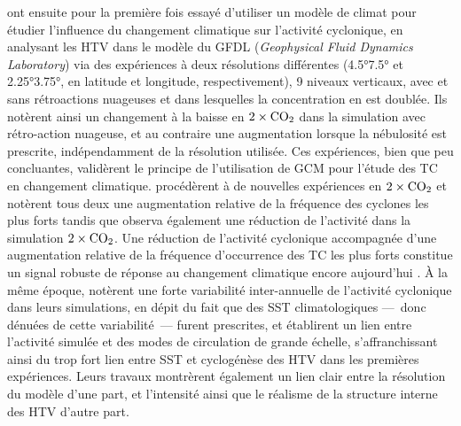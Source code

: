 \documentclass[../main.tex]{subfiles}
\begin{document}
\textcite{broccoli_can_1990} ont ensuite pour la première fois essayé d'utiliser un modèle de climat pour étudier l'influence du changement climatique sur
l'activité cyclonique, en analysant les HTV dans le modèle du GFDL (\textit{Geophysical Fluid Dynamics Laboratory}) via des expériences à deux résolutions
différentes (\ang{4.5}\times\ang{7.5} et \ang{2.25}\times\ang{3.75}, en latitude et longitude, respectivement), \num{9} niveaux verticaux, avec et sans
rétroactions nuageuses et dans lesquelles la concentration en  est doublée. Ils notèrent ainsi un changement à la baisse en \ensuremath{2\times\ce{CO2}}
dans la simulation avec rétro-action nuageuse, et au contraire une augmentation lorsque la nébulosité est prescrite, indépendamment de la résolution utilisée.
Ces expériences, bien que peu concluantes, validèrent le principe de l'utilisation de GCM pour l'étude des TC en changement climatique.
\textcite{haarsma_tropical_1993,bengtsson_will_1996} procédèrent à de nouvelles expériences en \ensuremath{2\times\ce{CO2}} et notèrent tous deux une augmentation
relative de la fréquence des cyclones les plus forts tandis que \textcite{bengtsson_will_1996} observa également une réduction de l'activité dans la simulation
\ensuremath{2\times\ce{CO2}}. Une réduction de l'activité cyclonique accompagnée d'une augmentation relative de la fréquence d'occurrence des TC les plus forts
constitue un signal robuste de réponse au changement climatique encore aujourd'hui \parencite[][voir
\cref{sec:projections_futures}]{walsh_tropical_2016,camargo_tropical_2016,knutson_tropical_2010,knutson_tropical_2010,seneviratne_weather_2021}. À la même
époque, \textcite{bengtsson_hurricanetype_1995} notèrent une forte variabilité inter-annuelle de l'activité cyclonique dans leurs simulations, en dépit du fait que
des SST climatologiques ---~donc dénuées de cette variabilité~--- furent prescrites, et établirent un lien entre l'activité simulée et des modes de circulation
de grande échelle, s'affranchissant ainsi du trop fort lien entre SST et cyclogénèse des HTV dans les premières expériences. Leurs travaux montrèrent également
un lien clair entre la résolution du modèle d'une part, et l'intensité ainsi que le réalisme de la structure interne des HTV d'autre part.
\end{document}

